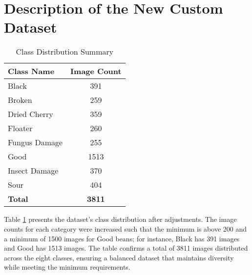 \section{Description of the New Custom Dataset}
\label{sec:description_dataset}
\begin{table}[H]
	\centering
	\caption{Class Distribution Summary}
	\label{tab:class_dist_summary}
	\begin{tabular}{l c}
	\toprule
	\textbf{Class Name} & \textbf{Image Count} \\
	\midrule
	Black & 391 \\
	Broken & 259 \\
	Dried Cherry & 359 \\
	Floater & 260 \\
	Fungus Damage & 255 \\
	Good & 1513 \\
	Insect Damage & 370 \\
	Sour & 404 \\
	\midrule
	\textbf{Total} & \textbf{3811} \\
	\bottomrule
	\end{tabular}
\end{table}

Table \ref{tab:class_dist_summary} presents the dataset's class distribution after adjustments. The image counts for each category were increased such that the minimum is above 200 and a minimum of 1500 images for Good beans; for instance, Black has 391 images and Good has 1513 images. The table confirms a total of 3811 images distributed across the eight classes, ensuring a balanced dataset that maintains diversity while meeting the minimum requirements.

\begin{table}[H]
    \centering
    \caption{Dataset Split Summary}
    \label{tab:dataset_split_summary}
\end{table}

